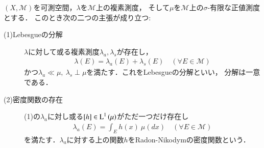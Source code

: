	\begin{itembox}[l]{}
		\begin{thm}
			$(X,\mathcal{M})$を可測空間，$\lambda$を$\mathcal{M}$上の複素測度，
			そして$\mu$を$\mathcal{M}$上の$\sigma$-有限な正値測度とする．
			このとき次の二つの主張が成り立つ:
			\begin{description}
				\item[(1)Lebesgueの分解] $\lambda$に対して或る複素測度$\lambda_a,\lambda_s$が存在し，
					\begin{align}
						\lambda(E) = \lambda_a(E) + \lambda_s(E) \quad (\forall E \in \mathcal{M})
					\end{align}
					かつ$\lambda_a \ll \mu,\ \lambda_s \perp \mu$を満たす．これをLebesgueの分解といい，
					分解は一意である．
					
				\item[(2)密度関数の存在] (1)の$\lambda_a$に対し或る$[h] \in \operatorname{L}^{1} \left(\mu\right)$がただ一つだけ存在し
					\begin{align}
						\lambda_a(E) = \int_E h(x)\ \mu(dx) \quad (\forall E \in \mathcal{M})
					\end{align}
					を満たす．$\lambda_a$に対する上の関数$h$をRadon-Nikodymの密度関数という．
			\end{description}
		\end{thm}
	\end{itembox}
	
